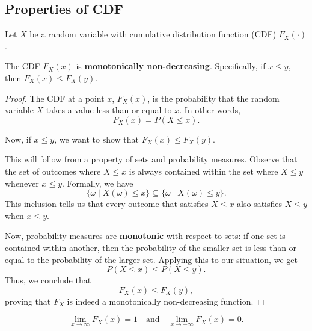 \subsection{Properties of CDF}

Let \( X \) be a random variable with cumulative distribution function (CDF) \( F_X(\cdot) \). 

\begin{theorem}
    The CDF \( F_X(x) \) is \textbf{monotonically non-decreasing}. Specifically, if \( x \leq y \), then \( F_X(x) \leq F_X(y) \).    
\end{theorem}

\begin{proof}
    The CDF at a point \( x \), \( F_X(x) \), is the probability that the random variable \( X \) takes a value less than or equal to \( x \). In other words,
\[
F_X(x) = P(X \leq x).
\]

Now, if \( x \leq y \), we want to show that \( F_X(x) \leq F_X(y) \). 

This will follow from a property of sets and probability measures. Observe that the set of outcomes where \( X \leq x \) is always contained within the set where \( X \leq y \) whenever \( x \leq y \). Formally, we have
\[
\{\omega \mid X(\omega) \leq x\} \subseteq \{\omega \mid X(\omega) \leq y\}.
\]
This inclusion tells us that every outcome that satisfies \( X \leq x \) also satisfies \( X \leq y \) when \( x \leq y \).

Now, probability measures are \textbf{monotonic} with respect to sets: if one set is contained within another, then the probability of the smaller set is less than or equal to the probability of the larger set. Applying this to our situation, we get
\[
P(X \leq x) \leq P(X \leq y).
\]
Thus, we conclude that
\[
F_X(x) \leq F_X(y),
\]
proving that \( F_X \) is indeed a monotonically non-decreasing function.
\end{proof}

\begin{theorem}
    \[
\lim_{x \to \infty} F_X(x) = 1 \quad \text{and} \quad \lim_{x \to -\infty} F_X(x) = 0.
\]
\end{theorem}

